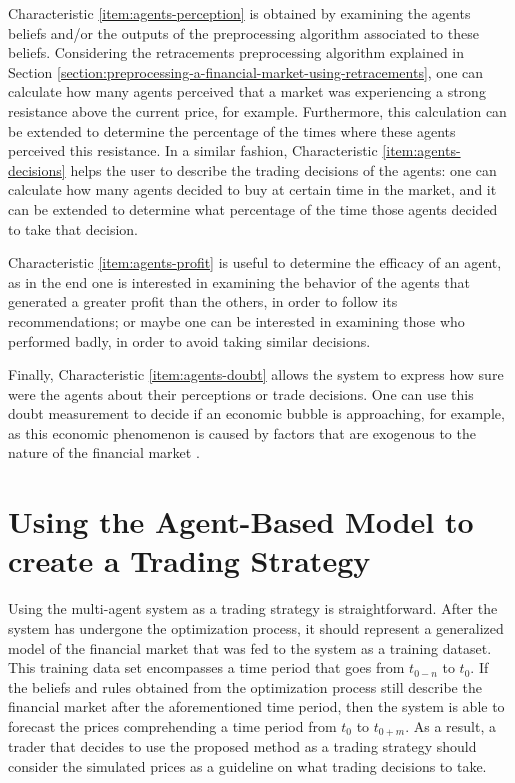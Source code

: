 Characteristic \ref{item:agents-perception} is obtained by examining the agents beliefs and/or
the outputs of the preprocessing algorithm associated to these
beliefs. Considering the retracements preprocessing algorithm explained in
Section \ref{section:preprocessing-a-financial-market-using-retracements}, one
can calculate how many agents perceived that a market was experiencing a strong
resistance above the current price, for example. Furthermore, this calculation
can be extended to determine the percentage of the times where these agents
perceived this resistance. In a similar fashion, Characteristic \ref{item:agents-decisions}
helps the user to describe the trading decisions of the agents: one can
calculate how many agents decided to buy at certain time in the market, and it
can be extended to determine what percentage of the time those agents decided to
take that decision.

Characteristic \ref{item:agents-profit} is useful to determine the efficacy of an agent, as in
the end one is interested in examining the behavior of the agents that generated
a greater profit than the others, in order to follow its recommendations; or
maybe one can be interested in examining those who performed badly, in order to
avoid taking similar decisions.

Finally, Characteristic \ref{item:agents-doubt} allows the system to express how sure were the
agents about their perceptions or trade decisions. One can use this doubt
measurement to decide if an economic bubble is approaching, for example, as this
economic phenomenon is caused by factors that are exogenous to the nature of the
financial market \cite{Martin2011}.

\section{Using the Agent-Based Model to create a Trading Strategy}
\label{section:using-the-agent-based-model-to-create-a-trading-strategy}

Using the multi-agent system as a trading strategy is straightforward. After the
system has undergone the optimization process, it should represent a
generalized model of the financial market that was fed to the system as a
training dataset. This training data set encompasses a time period that goes
from $t_{0-n}$ to $t_0$. If the beliefs and rules obtained from the optimization
process still describe the financial market after the aforementioned time
period, then the system is able to forecast the prices comprehending a time
period from $t_0$ to $t_{0+m}$. As a result, a trader that decides to use the
proposed method as a trading strategy should consider the simulated prices as a
guideline on what trading decisions to take.
